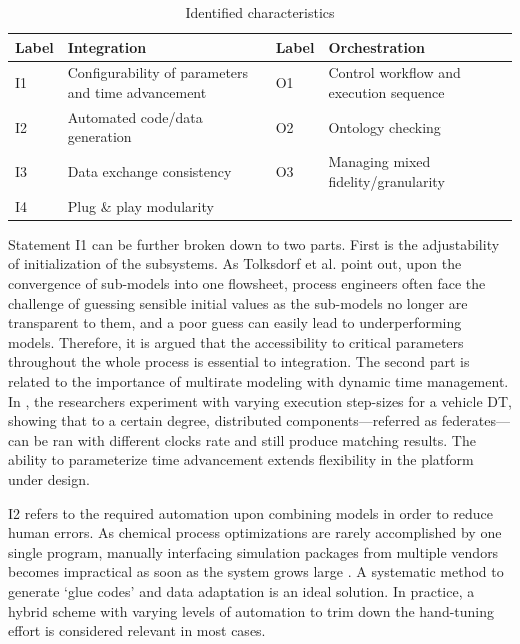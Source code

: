 \documentclass[journal,onecolumn]{IEEEtran} %
\begin{document}
\begin{table}[hbt!]
\centering
\begin{tabular}{|l|l||l|l|}
\hline
\textbf{Label} & \textbf{Integration}           & \textbf{Label} & \textbf{Orchestration}              \\ \hline
I1 & Configurability of parameters and time advancement & O1 & Control workflow and execution sequence \\ \hline
I2             & Automated code/data generation & O2             & Ontology checking                   \\ \hline
I3             & Data exchange consistency      & O3             & Managing mixed fidelity/granularity \\ \hline
I4             & Plug \& play modularity        &                &                                     \\ \hline
\end{tabular}
\caption{Identified characteristics}
\label{tab:char}
\end{table}

Statement I1 can be further broken down to two parts. First is the adjustability of initialization of the subsystems. As Tolksdorf et al. \cite{Tolksdorf2016} point out, upon the convergence of sub-models into one flowsheet, process engineers often face the challenge of guessing sensible initial values as the sub-models no longer are transparent to them, and a poor guess can easily lead to underperforming models. Therefore, it is argued that the accessibility to critical parameters throughout the whole process is essential to integration. The second part is related to the importance of multirate modeling with dynamic time management. In \cite{Neema2014}, the researchers experiment with varying execution step-sizes for a vehicle DT, showing that to a certain degree, distributed components---referred as federates---can be ran with different clocks rate and still produce matching results. The ability to parameterize time advancement extends flexibility in the platform under design.

I2 refers to the required automation upon combining models in order to reduce human errors. As chemical process optimizations are rarely accomplished by one single program, manually interfacing simulation packages from multiple vendors becomes impractical as soon as the system grows large \cite{Krone2020}. A systematic method to generate `glue codes' and data adaptation is an ideal solution. In practice, a hybrid scheme with varying levels of automation to trim down the hand-tuning effort is considered relevant in most cases.
\end{document}
